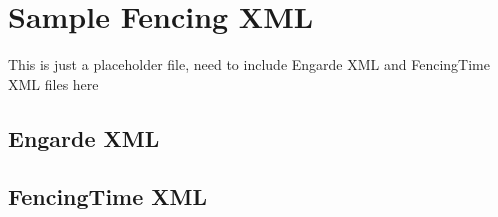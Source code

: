 \chapter{Sample Fencing XML} \label{appendix-sample-fencing-xml}

This is just a placeholder file, need to include Engarde XML and FencingTime XML
files here

\section{Engarde XML} \label{engarde-xml-sample}

\section{FencingTime XML} \label{fencingtime-xml-sample}

